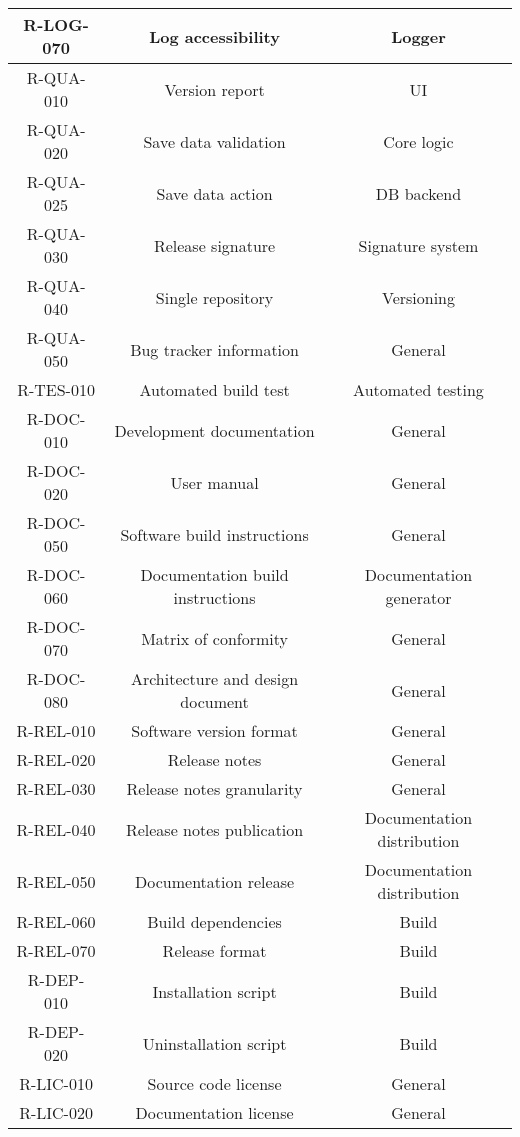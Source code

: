 \begin{longtable}{| c | c | c |}
  R-LOG-070 & Log accessibility & Logger \\ \hline
  R-QUA-010 & Version report & UI \\ \hline
  R-QUA-020 & Save data validation & Core logic \\ \hline
  R-QUA-025 & Save data action & DB backend \\ \hline
  R-QUA-030 & Release signature & Signature system \\ \hline
  R-QUA-040 & Single repository & Versioning \\ \hline
  R-QUA-050 & Bug tracker information & General \\ \hline
  R-TES-010 & Automated build test & Automated testing \\ \hline
  R-DOC-010 & Development documentation & General \\ \hline
  R-DOC-020 & User manual & General \\ \hline
  R-DOC-050 & Software build instructions & General \\ \hline
  R-DOC-060 & Documentation build instructions & Documentation generator \\ \hline
  R-DOC-070 & Matrix of conformity & General \\ \hline
  R-DOC-080 & Architecture and design document & General \\ \hline
  R-REL-010 & Software version format & General \\ \hline
  R-REL-020 & Release notes & General \\ \hline
  R-REL-030 & Release notes granularity & General \\ \hline
  R-REL-040 & Release notes publication & Documentation distribution \\ \hline
  R-REL-050 & Documentation release & Documentation distribution \\ \hline
  R-REL-060 & Build dependencies & Build \\ \hline
  R-REL-070 & Release format & Build \\ \hline
  R-DEP-010 & Installation script & Build \\ \hline
  R-DEP-020 & Uninstallation script & Build \\ \hline
  R-LIC-010 & Source code license & General \\ \hline
  R-LIC-020 & Documentation license & General \\ \hline
\end{longtable}

